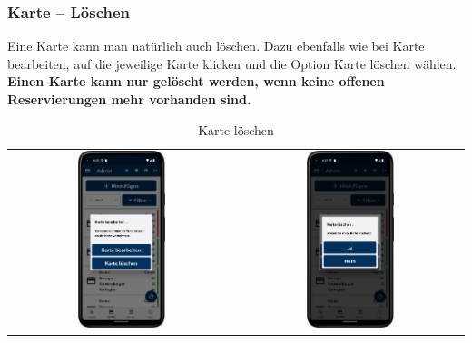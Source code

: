 \newpage

\subsubsection{Karte – Löschen} \label{subsubsec:deleteCard}
Eine Karte kann man natürlich auch löschen. Dazu ebenfalls wie bei Karte bearbeiten, auf die jeweilige Karte klicken und die Option Karte löschen wählen. \textbf{Einen Karte kann nur gelöscht werden, wenn keine offenen Reservierungen mehr vorhanden sind.}

\vspace{1cm}
\begin{table}[htbp]
  \centering
  \begin{tabular}{cc}
    \includegraphics[width=0.4\textwidth]{FLUTTER/images/ZB/card_page_selector.png} &
    \includegraphics[width=0.4\textwidth]{FLUTTER/images/ZB/card_delete_page.png} \\
  \end{tabular}
  \label{tab:example}
  \captionsetup{type=figure}
  \caption{Karte löschen}
\end{table}

